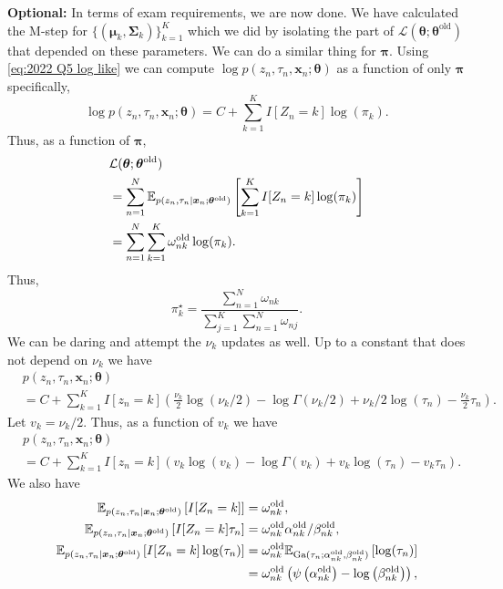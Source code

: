 \textbf{Optional:}  In terms of exam requirements, we are now done. We have calculated the M-step for $\{(\bm{\mu}_k,\bm{\Sigma}_k)\}_{k=1}^K$ which we did by isolating the part of $\mathcal{L}(\bm{\theta};\bm{\theta}^{\text{old}})$ that depended on these parameters. We can do a similar thing for $\bm{\pi}$. Using \eqref{eq:2022 Q5 log like} we can compute $\log p(z_n,\tau_n,\bm{x}_n;\bm{\theta})$ as a function of only $\bm{\pi}$ specifically,
\[\log p(z_n,\tau_n,\bm{x}_n;\bm{\theta}) = C +\sum_{k=1}^K I[Z_n = k]\log(\pi_k). \]
Thus, as a function of $\bm{\pi}$,
\begin{align*}
    &\mathcal{L}(\bm{\theta};\bm{\theta}^{\text{old}})\\
    &=\sum_{n=1}^N{\mathbb E}_{p(z_n,\tau_n\mid \bm{x}_n;\bm{\theta}^{\text{old}})}\left[\sum_{k=1}^KI[Z_n=k]\log(\pi_k)\right]\\
    &=\sum_{n=1}^N \sum_{k=1}^K\omega_{nk}^{\text{old}}\log(\pi_k).
\end{align*}
Thus,
\[\pi_k^\star = \frac{\sum_{n=1}^N \omega_{nk}}{\sum_{j=1}^K\sum_{n=1}^N \omega_{nj}}. \]
We can be daring and attempt the $\nu_k$ updates as well. Up to a constant that does not depend on $\nu_k$ we have
\begin{align*}
   & p(z_n,\tau_n,\bm{x}_n;\bm{\theta})\\
   &=C+\sum_{k=1}^KI[z_n = k]\left(\frac{\nu_k}{2}\log(\nu_k/2)-\log \Gamma(\nu_k/2) + \nu_k/2\log(\tau_n) -\frac{\nu_k}{2}\tau_n\right).
\end{align*}
Let $v_k = \nu_k/2$. Thus, as a function of $v_k$ we have
\begin{align*}
    & p(z_n,\tau_n,\bm{x}_n;\bm{\theta})\\
   &=C+\sum_{k=1}^KI[z_n = k]\left(v_k\log(v_k)-\log \Gamma(v_k) + v_k\log(\tau_n) -v_k\tau_n\right).
\end{align*}
We also have
\begin{align*}
    {\mathbb E}_{p(z_n,\tau_n\mid \bm{x}_n;\bm{\theta}^{\text{old}})}\left[I[Z_n=k]\right]&=\omega_{nk}^{\mathrm{old}},\\
    {\mathbb E}_{p(z_n,\tau_n\mid \bm{x}_n;\bm{\theta}^{\text{old}})}\left[I[Z_n=k]\tau_n\right]&=\omega_{nk}^{\mathrm{old}}\alpha_{nk}^{\text{old}}/\beta_{nk}^{\text{old}},\\
    {\mathbb E}_{p(z_n,\tau_n\mid \bm{x}_n;\bm{\theta}^{\text{old}})}\left[I[Z_n=k]\log(\tau_n)\right]&=\omega_{nk}^{\mathrm{old}}{\mathbb E}_{\mathrm{Ga}(\tau_n;\alpha_{nk}^{\text{old}},\beta_{nk}^{\text{old}})}\left[\log(\tau_n)\right]\\
    &=\omega_{nk}^{\mathrm{old}}\left(\psi\left(\alpha_{nk}^{\text{old}}\right) - \log\left(\beta_{nk}^{\text{old}}\right)\right),
\end{align*}
